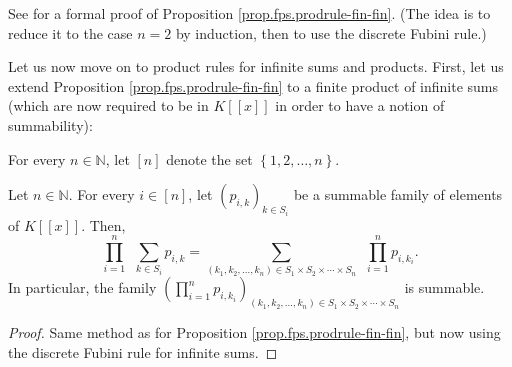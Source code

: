 See \cite[solution to Exercise 6.9]{detnotes} for a formal proof of
Proposition \ref{prop.fps.prodrule-fin-fin}. (The idea is to reduce it to the
case $n=2$ by induction, then to use the discrete Fubini rule.)

Let us now move on to product rules for infinite sums and products. First, let
us extend Proposition \ref{prop.fps.prodrule-fin-fin} to a finite product of
infinite sums (which are now required to be in $K\left[  \left[  x\right]
\right]  $ in order to have a notion of summability):

\begin{proposition}
\label{prop.fps.prodrule-fin-inf}For every $n\in\mathbb{N}$, let $\left[
n\right]  $ denote the set $\left\{  1,2,\ldots,n\right\}  $.

Let $n\in\mathbb{N}$. For every $i\in\left[  n\right]  $, let $\left(
p_{i,k}\right)  _{k\in S_{i}}$ be a summable family of elements of $K\left[
\left[  x\right]  \right]  $. Then,%
\begin{equation}
\prod_{i=1}^{n}\ \ \sum_{k\in S_{i}}p_{i,k}=\sum_{\left(  k_{1},k_{2}%
,\ldots,k_{n}\right)  \in S_{1}\times S_{2}\times\cdots\times S_{n}}%
\ \ \prod_{i=1}^{n}p_{i,k_{i}}. \label{eq.lem.fps.prodrule-fin-inf.eq}%
\end{equation}
In particular, the family $\left(  \prod_{i=1}^{n}p_{i,k_{i}}\right)
_{\left(  k_{1},k_{2},\ldots,k_{n}\right)  \in S_{1}\times S_{2}\times
\cdots\times S_{n}}$ is summable.
\end{proposition}

\begin{proof}
Same method as for Proposition \ref{prop.fps.prodrule-fin-fin}, but now using
the discrete Fubini rule for infinite sums.
\end{proof}


